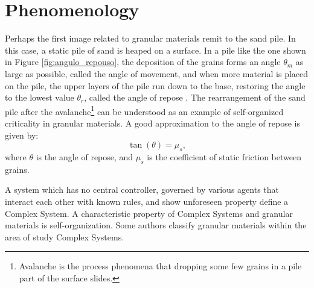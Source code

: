 \section{Phenomenology}
\label{subchap:Fenomenologia}
    Perhaps the first image related to granular materials remit to the sand pile. In this case, a static pile of sand is heaped on a surface. In a pile like the one shown in Figure \ref{fig:angulo_repouso}, the deposition of the grains forms an angle $\theta _m$ as large as possible, called the angle of movement, and when more material is placed on the pile, the upper layers of the pile run down to the base, restoring the angle to the lowest value $\theta _r$, called the angle of repose \cite{Sands_Powders_and_Grains, Granular_Physics}. The rearrangement of the sand pile after the avalanche\footnote{Avalanche is the process phenomena that dropping some few grains in a pile part of the surface slides.} can be understood as an example of self-organized criticality in granular materials. A good approximation to the angle of repose is given by:
    \begin{equation}
        \label{equ:atrito}
        \tan(\theta) = \mu _s ,
    \end{equation}
where $\theta$ is the angle of repose, and $\mu _s$ is the coefficient of static friction between grains.

    A system which has no central controller, governed by various agents that interact each other with known rules, and show unforeseen property define a Complex System. A characteristic property of Complex Systems and granular materials is self-organization. Some authors \cite{Avalanche_Dynamics_in_a_Pile_of_Rice, Avalanche_Prediction_in_a_Self-Organized_Pile_of_Beads, Mixing_and_Segregation_of_Granular_Materials, Measuring_the_flowing_properties_of_powders_and_grains, Revisiting_localized_deformation_in_sand_with_complex_systems, Granular_matter_and_networks, Patterns_and_collective_behavior_in_granular_media, Florent-Tese} classify granular materials within the area of study Complex Systems.

